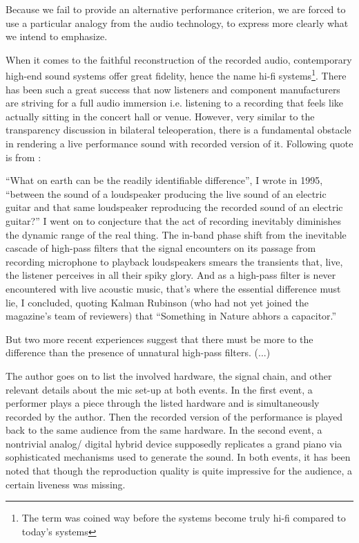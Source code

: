 Because we fail to provide an alternative performance criterion, we are forced to use a particular analogy from the audio
technology, to express more clearly what we intend to emphasize. 

When it comes to the faithful reconstruction of the recorded audio, contemporary high-end sound systems offer great fidelity, hence 
the name hi-fi systems\footnote{The term was coined way before the systems become truly hi-fi compared to today's systems}. There has 
been such a great success that now listeners and component manufacturers are striving for a full audio immersion i.e. listening to 
a recording that feels like actually sitting in the concert hall or venue. However, very similar to the transparency discussion 
in bilateral teleoperation, there is a fundamental obstacle in rendering a live performance sound with recorded version of it. 
Following quote is from \cite{atkinson}:

\begin{displayquote}
\enquote{What on earth can be the readily identifiable difference}, I wrote in 1995, \enquote{between the sound of a loudspeaker 
producing the live sound of an electric guitar and that same loudspeaker reproducing the recorded sound of an electric guitar?} 
I went on to conjecture that the act of recording inevitably diminishes the dynamic range of the real thing. The in-band phase 
shift from the inevitable cascade of high-pass filters that the signal encounters on its passage from recording microphone to 
playback loudspeakers smears the transients that, live, the listener perceives in all their spiky glory. And as a high-pass filter 
is never encountered with live acoustic music, that's where the essential difference must lie, I concluded, quoting Kalman Rubinson 
(who had not yet joined the magazine's team of reviewers) that \enquote{Something in Nature abhors a capacitor.}

But two more recent experiences suggest that there must be more to the difference than the presence of unnatural high-pass filters. 
(...)
\end{displayquote}

The author goes on to list the involved hardware, the signal chain, and other relevant details about the mic set-up at both events.
In the first event, a performer plays a piece through the listed hardware and is simultaneously recorded by the author. Then the recorded 
version of the performance is played back to the same audience from the same hardware. In the second event, a nontrivial analog/
digital hybrid device supposedly replicates a grand piano via sophisticated mechanisms used to generate the sound. In both 
events, it has been noted that though the reproduction quality is quite impressive for the audience, a certain liveness was missing.

